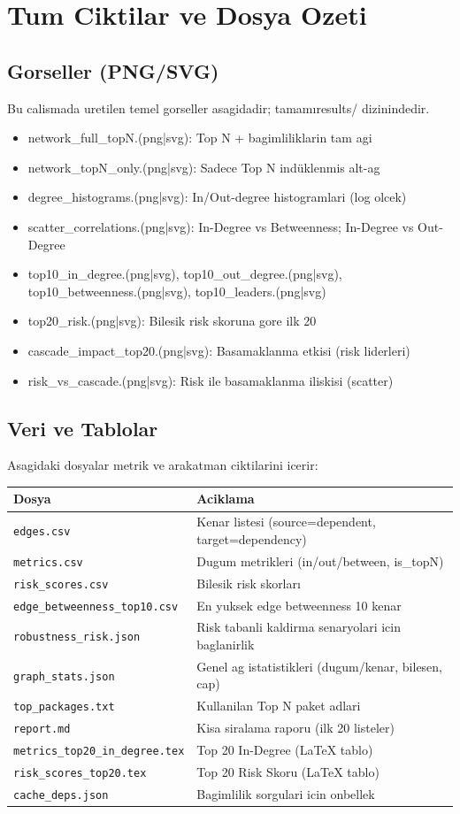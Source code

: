 \documentclass[11pt,a4paper]{article}
\begin{document}
\section{Tum Ciktilar ve Dosya Ozeti}
\subsection{Gorseller (PNG/SVG)}
Bu calismada uretilen temel gorseller asagidadir; tamam\i results/ dizinindedir.
\begin{itemize}
  \item network\_full\_topN.(png|svg): Top N + bagimliliklarin tam agi
  \item network\_topN\_only.(png|svg): Sadece Top N ind\"uklenmis alt-ag
  \item degree\_histograms.(png|svg): In/Out-degree histogramlari (log olcek)
  \item scatter\_correlations.(png|svg): In-Degree vs Betweenness; In-Degree vs Out-Degree
  \item top10\_in\_degree.(png|svg), top10\_out\_degree.(png|svg), top10\_betweenness.(png|svg), top10\_leaders.(png|svg)
  \item top20\_risk.(png|svg): Bilesik risk skoruna gore ilk 20
  \item cascade\_impact\_top20.(png|svg): Basamaklanma etkisi (risk liderleri)
  \item risk\_vs\_cascade.(png|svg): Risk ile basamaklanma iliskisi (scatter)
\end{itemize}

\subsection{Veri ve Tablolar}
Asagidaki dosyalar metrik ve arakatman ciktilarini icerir:
\begin{longtable}{ll}
\toprule
\textbf{Dosya} & \textbf{Aciklama} \\
\midrule
\texttt{edges.csv} & Kenar listesi (source=dependent, target=dependency) \\
\texttt{metrics.csv} & Dugum metrikleri (in/out/between, is\_topN) \\
\texttt{risk\_scores.csv} & Bilesik risk skorlar\i \\
\texttt{edge\_betweenness\_top10.csv} & En yuksek edge betweenness 10 kenar \\
\texttt{robustness\_risk.json} & Risk tabanli kaldirma senaryolari icin baglanirlik \\
\texttt{graph\_stats.json} & Genel ag istatistikleri (dugum/kenar, bilesen, cap) \\
\texttt{top\_packages.txt} & Kullanilan Top N paket adlari \\
\texttt{report.md} & Kisa siralama raporu (ilk 20 listeler) \\
\texttt{metrics\_top20\_in\_degree.tex} & Top 20 In-Degree (LaTeX tablo) \\
\texttt{risk\_scores\_top20.tex} & Top 20 Risk Skoru (LaTeX tablo) \\
\texttt{cache\_deps.json} & Bagimlilik sorgulari icin onbellek \\
\bottomrule
\end{longtable}
\end{document}
